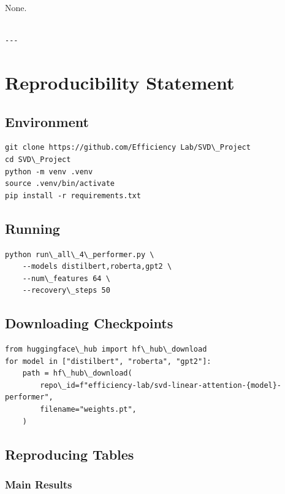 None.
\begin{lstlisting}

---
\end{lstlisting}


\section{Reproducibility Statement}

\subsection{Environment}

\begin{lstlisting}
git clone https://github.com/Efficiency Lab/SVD\_Project
cd SVD\_Project
python -m venv .venv
source .venv/bin/activate
pip install -r requirements.txt
\end{lstlisting}

\subsection{Running}

\begin{lstlisting}
python run\_all\_4\_performer.py \
    --models distilbert,roberta,gpt2 \
    --num\_features 64 \
    --recovery\_steps 50
\end{lstlisting}

\subsection{Downloading Checkpoints}

\begin{lstlisting}
from huggingface\_hub import hf\_hub\_download
for model in ["distilbert", "roberta", "gpt2"]:
    path = hf\_hub\_download(
        repo\_id=f"efficiency-lab/svd-linear-attention-{model}-performer",
        filename="weights.pt",
    )
\end{lstlisting}

\subsection{Reproducing Tables}

\subsubsection{Main Results}

